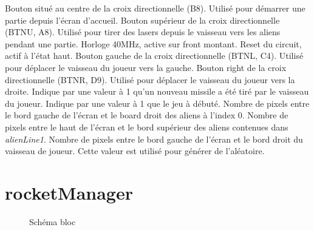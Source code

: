 \documentclass[french]{nakrule}
\begin{document}
\begin{descr}
   Bouton situé au centre de la croix directionnelle (B8).
  Utilisé pour démarrer une partie depuis l'écran d'accueil.
   Bouton supérieur de la croix directionnelle (BTNU, A8).
  Utilisé pour tirer des lasers depuis le vaisseau vers les aliens pendant une partie.
   Horloge 40MHz, active sur front montant.
   Reset du circuit, actif à l'état haut.
   Bouton gauche de la croix directionnelle (BTNL, C4). Utilisé
  pour déplacer le vaisseau du joueur vers la gauche.
   Bouton right de la croix directionnelle (BTNR, D9). Utilisé
  pour déplacer le vaisseau du joueur vers la droite.
   Indique par une valeur à 1 qu'un nouveau missile a été
  tiré par le vaisseau du joueur.
   Indique par une valeur à 1 que le jeu à débuté.
   Nombre de pixels entre le bord gauche de l'écran et le
  board droit des aliens à l'index 0.
   Nombre de pixels entre le haut de l'écran et le bord
  supérieur des aliens contenues dans \emph{alienLine1}.
   Nombre de pixels entre le bord gauche de l'écran et
  le bord droit du vaisseau de joueur. Cette valeur est utilisé pour générer de l'aléatoire.
\end{descr}

\clearpage

\section{rocketManager}
\label{sec:rocketmanager}

\begin{figure}
\caption{Schéma bloc}
\label{rocketManagerBloc}
\end{figure}
\end{document}
